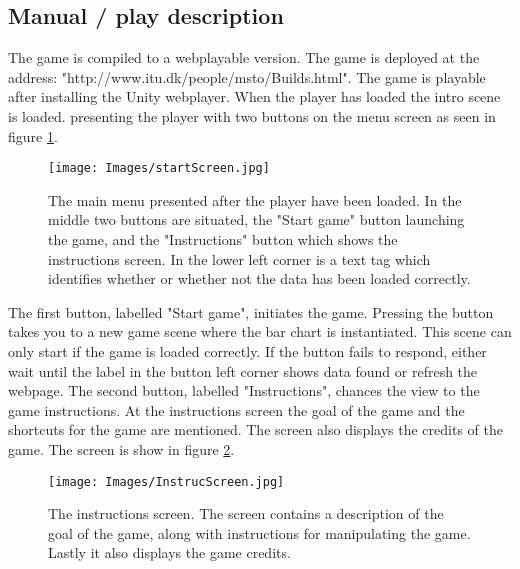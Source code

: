 \documentclass[a4paper,11pt]{article}
\begin{document}
\subsection{Manual / play description}
The game is compiled to a webplayable version. The game is deployed at the address: "http://www.itu.dk/people/msto/Builds.html". The game is playable after installing the Unity webplayer. When the player has loaded the intro scene is loaded. presenting the player with two buttons on the menu screen as seen in figure \ref{fig:menu}.
\begin{figure}[h]
    \centering
    \texttt{[image: Images/startScreen.jpg]}
    \caption{The main menu presented after the player have been loaded. In the middle two buttons are situated, the "Start game" button launching the game, and the "Instructions" button which shows the instructions screen. In the lower left corner is a text tag which identifies whether or whether not the data has been loaded correctly.}
    \label{fig:menu}
\end{figure}

The first button, labelled "Start game", initiates the game. Pressing the button takes you to a new game scene where the bar chart is instantiated. This scene can only start if the game is loaded correctly. If the button fails to respond, either wait until the label in the button left corner shows data found or refresh the webpage.
The second button, labelled "Instructions", chances the view to the game instructions. At the instructions screen the goal of the game and the shortcuts for the game are mentioned. The screen also displays the credits of the game. The screen is show in figure \ref{fig:instruc}.
\begin{figure}[h]
    \centering
    \texttt{[image: Images/InstrucScreen.jpg]}
    \caption{The instructions screen. The screen contains a description of the goal of the game, along with instructions for manipulating the game. Lastly it also displays the game credits.}
    \label{fig:instruc}
\end{figure}
\end{document}
